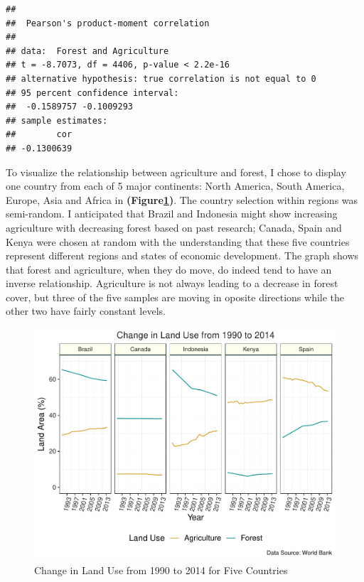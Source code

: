 \documentclass[12pt,]{article}
\begin{document}
\begin{verbatim}
## 
##  Pearson's product-moment correlation
## 
## data:  Forest and Agriculture
## t = -8.7073, df = 4406, p-value < 2.2e-16
## alternative hypothesis: true correlation is not equal to 0
## 95 percent confidence interval:
##  -0.1589757 -0.1009293
## sample estimates:
##        cor 
## -0.1300639
\end{verbatim}

To visualize the relationship between agriculture and forest, I chose to
display one country from each of 5 major continents: North America,
South America, Europe, Asia and Africa in
\textbf{(Figure\ref{fig:fig4})}. The country selection within regions
was semi-random. I anticipated that Brazil and Indonesia might show
increasing agriculture with decreasing forest based on past research;
Canada, Spain and Kenya were chosen at random with the understanding
that these five countries represent different regions and states of
economic development. The graph shows that forest and agriculture, when
they do move, do indeed tend to have an inverse relationship.
Agriculture is not always leading to a decrease in forest cover, but
three of the five samples are moving in oposite directions while the
other two have fairly constant levels.

\begin{figure}
\centering
\includegraphics{Marx_ENV872_Project_files/figure-latex/unnamed-chunk-7-1.pdf}
\caption{\label{fig:fig4}Change in Land Use from 1990 to 2014 for Five
Countries}
\end{figure}
\end{document}
